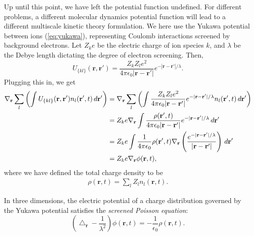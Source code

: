 \documentclass{article}
\begin{document}
Up until this point, we have left the potential function undefined. For different problems, a different molecular dynamics potential function will lead to a different multiscale kinetic theory formulation. We here use the Yukawa potential between ions (\ref{eq:yukawa}), representing Coulomb interactions screened by background electrons. Let $Z_ke$ be the electric charge of ion species $k$, and $\lambda$ be the Debye length dictating the degree of electron screening. Then,
\[U_{\{kl\}}(\mathbf{r},\mathbf{r}')=\frac{Z_kZ_l e^2}{4\pi \epsilon_0|\mathbf{r}-\mathbf{r}'|}e^{-|\mathbf{r}-\mathbf{r}'|/\lambda}.
\]
Plugging this in, we get
\begin{align}
\nabla_\mathbf{r}\sum_l\left(\int U_{\{kl\}}(\mathbf{r},\mathbf{r}') n_l(\mathbf{r}',t)\,d\mathbf{r}'\right)&=\nabla_\mathbf{r}\sum_l\left(\int \frac{Z_kZ_le^2}{4\pi \epsilon_0|\mathbf{r}-\mathbf{r}'|}e^{-|\mathbf{r}-\mathbf{r}'|/\lambda}n_l(\mathbf{r}',t)\,d\mathbf{r}'\right)\notag\\
&=Z_ke\nabla_\mathbf{r}\int\frac{\rho(\mathbf{r}',t)}{4\pi\epsilon_0|\mathbf{r}-\mathbf{r}'|}e^{-|\mathbf{r}-\mathbf{r}'|/\lambda}\,d\mathbf{r}'\notag\\
&=Z_ke\int\frac{1}{4\pi\epsilon_0}\rho(\mathbf{r}',t)\nabla_\mathbf{r}\left(\frac{e^{-|\mathbf{r}-\mathbf{r}'|/\lambda}}{|\mathbf{r}-\mathbf{r}'|}\right)\,d\mathbf{r}'\label{elecint}\\
&=Z_ke\nabla_\mathbf{r}\phi(\mathbf{r},t),\notag
\end{align}
where we have defined the total charge density to be
\begin{align}
\rho(\mathbf{r},t)=\sum_l Z_ln_l(\mathbf{r},t).
\end{align}

In three dimensions, the electric potential of a charge distribution governed by the Yukawa potential satisfies the \emph{screened Poisson equation}:
\begin{equation}
 \left(\bigtriangleup_\mathbf{r}-\frac{1}{\lambda^2}\right)\phi(\mathbf{r},t)=-\frac{1}{\epsilon_0}\rho(\mathbf{r},t).
\end{equation}
\end{document}
